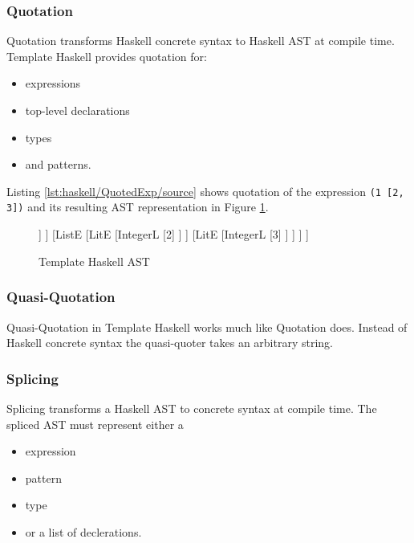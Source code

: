 \subsubsection{Quotation}

Quotation transforms Haskell concrete syntax to Haskell AST at compile time.
Template Haskell provides quotation for:
\begin{itemize}
	\item expressions
	\item top-level declarations
	\item types
	\item and patterns.
\end{itemize}

Listing \ref{lst:haskell/QuotedExp/source} shows quotation of the expression \lstinline{(1 [2, 3])} and its resulting AST representation in Figure \ref{fig:haskell/QuotedExp/ast}.


\begin{figure}[h]
	\centering
	\begin{forest}
		[TupE 
			[LitE 
				[IntegerL 
					[1]
				]
			]
			[ListE 
				[LitE 
					[IntegerL 
						[2]
					]
				]
				[LitE
					[IntegerL 
						[3]
					]
				]
			]
		]
	\end{forest}
	\caption{Template Haskell AST \label{fig:haskell/QuotedExp/ast}}
\end{figure}

\subsubsection{Quasi-Quotation}

Quasi-Quotation in Template Haskell works much like Quotation does.
Instead of Haskell concrete syntax the quasi-quoter takes an arbitrary string.

\subsubsection{Splicing}

Splicing transforms a Haskell AST to concrete syntax at compile time.
The spliced AST must represent either a
\begin{itemize}
	\item expression
	\item pattern
	\item type
	\item or a list of declerations.
\end{itemize}


